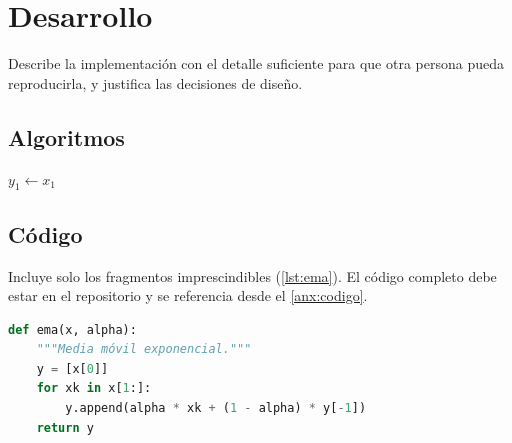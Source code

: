 \chapter{Desarrollo}\label{cap:desarrollo}

Describe la implementación con el detalle suficiente para que otra
persona pueda reproducirla, y justifica las decisiones de diseño.

\section{Algoritmos}

\begin{algorithm}[H]
  \caption{Media móvil exponencial.}
  \label{alg:ema}
  \KwIn{señal $x_1,\dots,x_N$, factor $\alpha \in (0,1]$}
  $y_1 \gets x_1$\;
\end{algorithm}

\section{Código}

Incluye solo los fragmentos imprescindibles (\cref{lst:ema}). El código
completo debe estar en el repositorio y se referencia desde el
\cref{anx:codigo}.

\begin{lstlisting}[language=Python, caption={Implementación del \cref{alg:ema}.}, label={lst:ema}]
def ema(x, alpha):
    """Media móvil exponencial."""
    y = [x[0]]
    for xk in x[1:]:
        y.append(alpha * xk + (1 - alpha) * y[-1])
    return y
\end{lstlisting}
